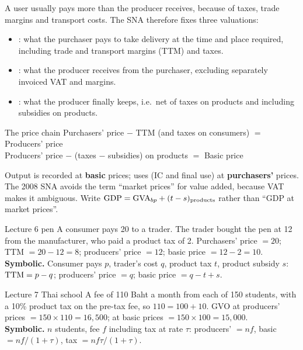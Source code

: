 A user usually pays more than the producer receives, because of taxes, trade margins and
transport costs. The SNA therefore fixes three valuations:
\begin{itemize}
\item {}: what the purchaser pays to take delivery at the time and place
  required, including trade and transport margins (TTM) and taxes.
\item {}: what the producer receives from the purchaser, excluding separately
  invoiced VAT and margins.
\item {}: what the producer finally keeps, i.e.\ net of taxes on products and
  including subsidies on products.
\end{itemize}

\begin{keybox}{The price chain}
\centering
Purchasers' price $-$ TTM (and taxes on consumers) $=$ Producers' price\\
Producers' price $-$ (taxes $-$ subsidies) on products $=$ Basic price\\[2pt]
\raggedright\small Output is recorded at \textbf{basic} prices; uses (IC and final use) at
\textbf{purchasers'} prices. The 2008 SNA avoids the term ``market prices'' for value added,
because VAT makes it ambiguous. Write $\mathrm{GDP}=\mathrm{GVA}_{bp}+(t-s)_{\text{products}}$ rather than
``GDP at market prices''.
\end{keybox}

\begin{tmpl}{Lecture 6 pen}
\small A consumer pays 20 to a trader. The trader bought the pen at 12 from the manufacturer,
who paid a product tax of 2. Purchasers' price $=20$; TTM $=20-12=8$; producers' price $=12$;
basic price $=12-2=10$.\\
\textbf{Symbolic.} Consumer pays $p$, trader's cost $q$, product tax $t$, product subsidy $s$:
$\mathrm{TTM}=p-q$; producers' price $=q$; basic price $=q-t+s$.
\end{tmpl}

\begin{tmpl}{Lecture 7 Thai school}
\small A fee of 110 Baht a month from each of 150 students, with a 10\% product tax on the
pre-tax fee, so $110 = 100 + 10$. GVO at producers' prices $=150\times110=16{,}500$; at basic
prices $=150\times100=15{,}000$.\\
\textbf{Symbolic.} $n$ students, fee $f$ including tax at rate $\tau$: producers' $=nf$, basic
$=nf/(1+\tau)$, tax $=nf\tau/(1+\tau)$.
\end{tmpl}

